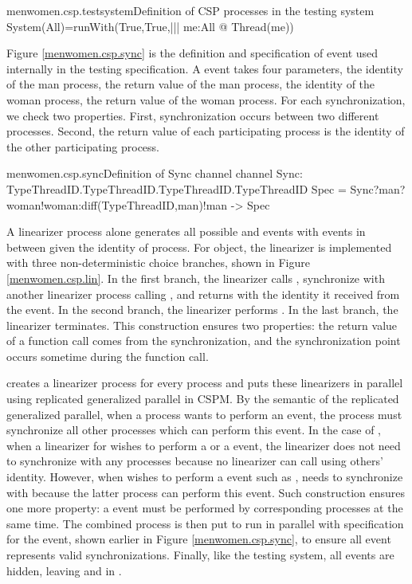 \documentclass{article}
\begin{document}
\begin{cspinline}{menwomen.csp.testsystem}{Definition of CSP processes in the testing system}
System(All)=runWith(True,True,||| me:All @ Thread(me))
\end{cspinline}

Figure \ref{menwomen.csp.sync} is the definition and specification of  event used internally in the testing specification. A  event takes four parameters, the identity of the man process, the return value of the man process, the identity of the woman process, the return value of the woman process. For each synchronization, we check two properties. First, synchronization occurs between two different processes. Second, the return value of each participating process is the identity of the other participating process. 

\begin{cspinline}{menwomen.csp.sync}{Definition of Sync channel}
channel Sync: TypeThreadID.TypeThreadID.TypeThreadID.TypeThreadID
Spec = Sync?man?woman!woman:diff(TypeThreadID,{man})!man -> Spec
\end{cspinline}

A linearizer process alone generates all possible  and  events with  events in between given the identity of process. For  object, the linearizer is implemented with three non-deterministic choice branches, shown in Figure \ref{menwomen.csp.lin}. In the first branch, the linearizer calls , synchronize with another linearizer process calling , and returns with the identity it received from the  event. In the second branch, the linearizer performs . In the last branch, the linearizer terminates. This construction ensures two properties: the return value of a function call comes from the synchronization, and the synchronization point occurs sometime during the function call. 

 creates a linearizer process for every process and puts these linearizers in parallel using replicated generalized parallel in CSPM. By the semantic of the replicated generalized parallel, when a process wants to perform an event, the process must synchronize all other processes which can perform this event. In the case of , when a linearizer for  wishes to perform a  or a  event, the linearizer does not need to synchronize with any processes because no linearizer can call using others' identity. However, when  wishes to perform a  event such as ,  needs to synchronize with  because the latter process can perform this  event. Such construction ensures one more property: a  event must be performed by corresponding processes at the same time. The combined process is then put to run in parallel with specification for the  event, shown earlier in Figure \ref{menwomen.csp.sync}, to ensure all  event represents valid synchronizations. Finally, like the testing system, all  events are hidden, leaving  and  in .
\end{document}
